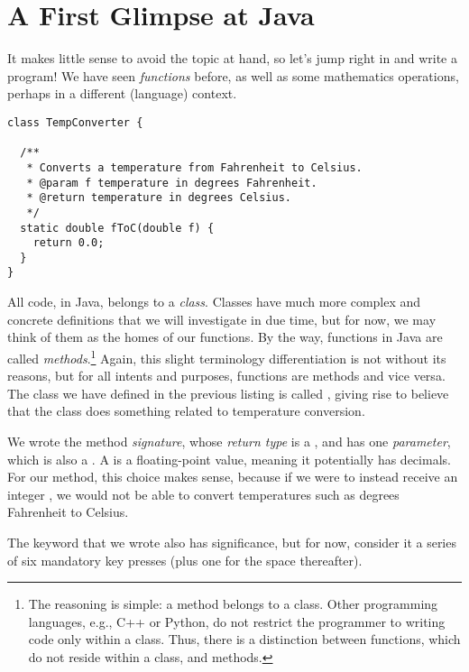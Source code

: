 \section{A First Glimpse at Java}

It makes little sense to avoid the topic at hand, so let's jump right in and write a program! 
We have seen \emph{functions} before, as well as some mathematics operations, perhaps in a different (language) context. 


\begin{lstlisting}[language=MyJava]
class TempConverter {
  
  /**
   * Converts a temperature from Fahrenheit to Celsius.
   * @param f temperature in degrees Fahrenheit.
   * @return temperature in degrees Celsius.
   */
  static double fToC(double f) {
    return 0.0;
  }
}
\end{lstlisting}

All code, in Java, belongs to a \emph{class}. 
Classes have much more complex and concrete definitions that we will investigate in due time, but for now, we may think of them as the homes of our functions. 
By the way, functions in Java are called \emph{methods}.\footnote{The reasoning is simple: a method belongs to a class. Other programming languages, e.g., C++ or Python, do not restrict the programmer to writing code only within a class. Thus, there is a distinction between functions, which do not reside within a class, and methods.} 
Again, this slight terminology differentiation is not without its reasons, but for all intents and purposes, functions are methods and vice versa. 
The class we have defined in the previous listing is called , giving rise to believe that the class does something related to temperature conversion.

We wrote the  method \emph{signature}, whose \emph{return type} is a , and has one \emph{parameter}, which is also a . 
A  is a floating-point value, meaning it potentially has decimals. 
For our method, this choice makes sense, because if we were to instead receive an integer , we would not be able to convert temperatures such as  degrees Fahrenheit to Celsius. 

The  keyword that we wrote also has significance, but for now, consider it a series of six mandatory key presses (plus one for the space thereafter).


